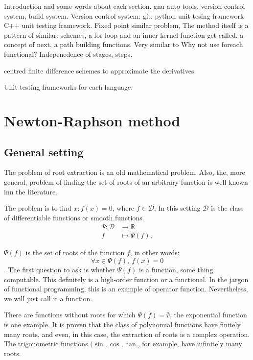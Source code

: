 \documentclass[12pt]{article}
\begin{document}
  
  \maketitle

Introduction and some words about each section.
gnu auto tools, version control system, build system.
Version control system: git.
python unit tesing framework
C++ unit testing framework.
Fixed point similar problem,  
The method itself is a pattern of similar:  schemes, a for loop and an inner kernel function get called, a concept of next, a path building functions.
Very similar to 
Why not use foreach functional? Indepenedence of stages, steps. 

centred finite difference schemes to approximate the derivatives. 


Unit testing frameworks for each language.  
  \section{Newton-Raphson method}
  	\subsection {General setting}
  		The problem of root extraction is an old mathematical problem.  
  		Also, the, more general, problem of finding the set of roots of an arbitrary function is well known inn the literature.  
   
  		The problem is to find \( x : f(x) =0\), where   \( f \in  \mathcal{D}\). In this setting \( \mathcal{D}\)  is the class of differentiable functions or smooth functions.
  			\begin{align} \label{eq:functionalPsi}
  				 \Psi \colon  \mathcal{D}   &\to \mathbb{R} \nonumber\\
  			 	f &\mapsto \Psi(f),
  			\end{align}
  
  		\(\Psi(f) \) is the set of roots of the function \( f \), in other words: \[ \forall  x \in \Psi(f),~f(x) =0\].
  		The first question to ask is whether \(\Psi(f) \) is a function, some thing computable. This definitely is a high-order function or a functional. 
  		In the jargon of functional programming, this is an example of operator function.  Nevertheless, we will just call it a function.  
  
  		There are functions without roots for which \( \Psi(f) = \emptyset \), the exponential function is one example.  
  		It is proven that the class of polynomial functions have finitely many roots, and even, in this case, the extraction of roots is a complex operation.
  		The trigonometric functions \((\sin, \cos,\tan\), for example, have infinitely many roots. 
  		
\end{document}
